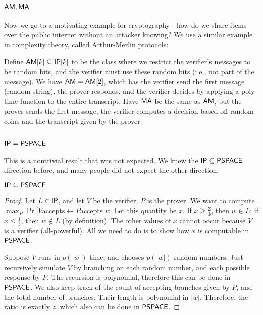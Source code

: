 \subsection{${\mathsf{AM}}, {\mathsf{MA}}$}
Now we go to a motivating example for cryptography - how do we share items over the public internet without an attacker knowing? We use a similar example in complexity theory, called Arthur-Merlin protocols:

\begin{definition}
Define ${\mathsf{AM}}[k] \subseteq {\ensuremath{\mathsf{IP}}}[k]$ to be the class where we restrict the verifier's messages to be random bits, and the verifier must use these random bits (i.e., not part of the message). We have ${\mathsf{AM}} = {\mathsf{AM}}[2]$, which has the verifier send the first message (random string), the prover responds, and the verifier decides by applying a poly-time function to the entire transcript. Have ${\mathsf{MA}}$ be the same as ${\mathsf{AM}}$, but the prover sends the first message, the verifier computes a decision based off random coins and the transcript given by the prover.
\end{definition}

\subsection{${\mathsf{IP}} = {\mathsf{PSPACE}}$}
This is a nontrivial result that was not expected. We knew the ${\mathsf{IP}} \subseteq {\ensuremath{\mathsf{PSPACE}}}$ direction before, and many people did not expect the other direction. 
\begin{theorem}
${\mathsf{IP}} \subseteq {\ensuremath{\mathsf{PSPACE}}}$
\end{theorem}

\begin{proof}
Let $L \in {\ensuremath{\mathsf{IP}}}$, and let $V$ be the verifier, $P$ is the prover. We want to compute $\max_{P}\Pr[V \text{accepts} \leftrightarrow P \text{accepts $w$}$. Let this quantity be $x$. If $x \ge \frac{2}{3}$, then $w \in L$; if $x \le \frac{1}{3}$, then $w \notin L$ (by definition). The other values of $x$ cannot occur because $V$ is a verifier (all-powerful). All we need to do is to show how $x$ is computable in ${\mathsf{PSPACE}}$.

\par Suppose $V$ runs in $p(|w|)$ time, and chooses $p(|w|)$ random numbers. Just recursively simulate $V$ by branching on each random number, and each possible response by $P$. The recursion is polynomial, therefore this can be done in ${\mathsf{PSPACE}}$. We also keep track of the count of accepting branches given by $P$, and the total number of branches. Their length is polynomial in $|w|$. Therefore, the ratio is exactly $z$, which also can be done in ${\mathsf{PSPACE}}$.
\end{proof}

